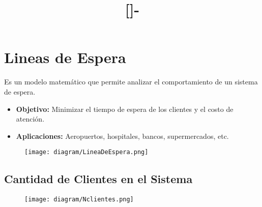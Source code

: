 \documentclass{templateNote}
\newcommand{\newparagraph}{\par\vspace{\baselineskip}\noindent}
\begin{document}

\title{[\asignatura]-\titulo}
\author{
    \autor
}
\portada
\margenes %

\section{Lineas de Espera}
Es un modelo matem\'atico que permite analizar el comportamiento de un sistema de espera.
\begin{itemize}
    \item \textbf{Objetivo:} Minimizar el tiempo de espera de los clientes y el costo de atenci\'on.
    
    \item \textbf{Aplicaciones:} Aeropuertos, hospitales, bancos, supermercados, etc.
\end{itemize}
\begin{figure}[H]
    \centering
    \texttt{[image: diagram/LineaDeEspera.png]}
\end{figure}
\newparagraph

\subsection*{Cantidad de Clientes en el Sistema}
\begin{figure}[H]
    \centering
    \texttt{[image: diagram/Nclientes.png]}
\end{figure}

\newpage
\end{document}
